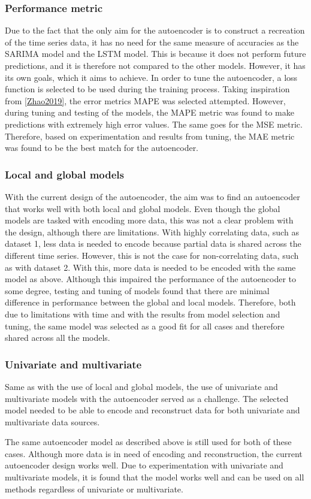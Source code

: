 \subsubsection{Performance metric}
Due to the fact that the only aim for the autoencoder is to construct a recreation of the time series data,
it has no need for the same measure of accuracies as the SARIMA model and the LSTM model.
This is because it does not perform future predictions, and it is therefore not compared to the other models.
However, it has its own goals, which it aims to achieve.
In order to tune the autoencoder, a loss function is selected to be used during the training process.
Taking inspiration from \cref{Zhao2019}, the error metrics MAPE was selected attempted.
However, during tuning and testing of the models, the MAPE metric was found to make predictions with extremely high error values.
The same goes for the MSE metric.
Therefore, based on experimentation and results from tuning,
the MAE metric was found to be the best match for the autoencoder.


\subsubsection{Local and global models}
With the current design of the autoencoder, the aim was to find an autoencoder that works well with both local and global models.
Even though the global models are tasked with encoding more data, this was not a clear problem with the design, although there are limitations.
With highly correlating data, such as dataset 1, less data is needed to encode because partial data is shared across the different time series.
However, this is not the case for non-correlating data, such as with dataset 2.
With this, more data is needed to be encoded with the same model as above.
Although this impaired the performance of the autoencoder to some degree, testing and tuning of models found that there are minimal difference in performance between the global and local models.
Therefore, both due to limitations with time and with the results from model selection and tuning,
the same model was selected as a good fit for all cases and therefore shared across all the models.

\subsubsection{Univariate and multivariate}
Same as with the use of local and global models,
the use of univariate and multivariate models with the autoencoder served as a challenge.
The selected model needed to be able to encode and reconstruct data for both univariate and multivariate data sources.

The same autoencoder model as described above is still used for both of these cases.
Although more data is in need of encoding and reconstruction,
the current autoencoder design works well.
Due to experimentation with univariate and multivariate models,
it is found that the model works well and can be used on all methods regardless of univariate or multivariate.




